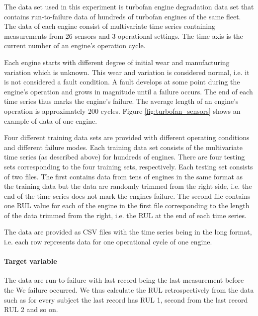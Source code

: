 The data set used in this experiment is turbofan engine degradation data set that contains run-to-failure data of hundreds of turbofan engines of the same fleet.
The data of each engine consist of multivariate time series containing measurements from 26 sensors and 3 operational settings.
The time axis is the current number of an engine's operation cycle.

Each engine starts with different degree of initial wear and manufacturing variation which is unknown.
This wear and variation is considered normal, i.e. it is not considered a fault condition.
A fault develops at some point during the engine's operation and grows in magnitude until a failure occurs.
The end of each time series thus marks the engine's failure.
The average length of an engine's operation is approximately 200 cycles.
Figure \ref{fig:turbofan_sensors} shows an example of data of one engine.

Four different training data sets are provided with different operating conditions and different failure modes.
Each training data set consists of the multivariate time series (as described above) for hundreds of engines.
There are four testing sets corresponding to the four training sets, respectively.
Each testing set consists of two files.
The first contains data from tens of engines in the same format as the training data but the data are randomly trimmed from the right side, i.e. the end of the time series does not mark the engines failure.
The second file contains one RUL value for each of the engine in the first file corresponding to the length of the data trimmed from the right, i.e. the RUL at the end of each time series.

The data are provided as CSV files with the time series being in the long format, i.e. each row represents data for one operational cycle of one engine.

\paragraph{Target variable}
The data are run-to-failure with last record being the last measurement before the We failure occurred.
We thus calculate the RUL retrospectively from the data such as for every subject the last record has RUL 1, second from the last record RUL 2 and so on.

